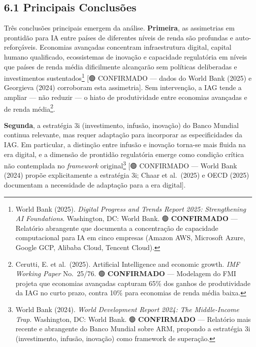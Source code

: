 \documentclass[
  brazilian,
  12pt,
]{article}
\begin{document}
\subsection{6.1 Principais Conclusões}\label{principais-conclusuxf5es}

Três conclusões principais emergem da análise. \textbf{Primeira}, as assimetrias em prontidão para IA entre países de diferentes níveis de renda são profundas e auto-reforçáveis. Economias avançadas concentram infraestrutura digital, capital humano qualificado, ecossistemas de inovação e capacidade regulatória em níveis que países de renda média dificilmente alcançarão sem políticas deliberadas e investimentos sustentados\footnote{World Bank (2025). \emph{Digital Progress and Trends Report 2025: Strengthening AI Foundations}. Washington, DC: World Bank. 🟢 \textbf{CONFIRMADO} --- Relatório abrangente que documenta a concentração de capacidade computacional para IA em cinco empresas (Amazon AWS, Microsoft Azure, Google GCP, Alibaba Cloud, Tencent Cloud).} {[}🟢 CONFIRMADO --- dados do World Bank (2025) e Georgieva (2024) corroboram esta assimetria{]}. Sem intervenção, a IAG tende a ampliar --- não reduzir --- o hiato de produtividade entre economias avançadas e de renda média\footnote{Cerutti, E. et al.~(2025). Artificial Intelligence and economic growth. \emph{IMF Working Paper} No.~25/76. 🟢 \textbf{CONFIRMADO} --- Modelagem do FMI projeta que economias avançadas capturam 65\% dos ganhos de produtividade da IAG no curto prazo, contra 10\% para economias de renda média baixa.}.

\textbf{Segunda}, a estratégia 3i (investimento, infusão, inovação) do Banco Mundial continua relevante, mas requer adaptação para incorporar as especificidades da IAG. Em particular, a distinção entre infusão e inovação torna-se mais fluida na era digital, e a dimensão de prontidão regulatória emerge como condição crítica não contemplada no \emph{framework} original\footnote{World Bank (2024). \emph{World Development Report 2024: The Middle-Income Trap}. Washington, DC: World Bank. 🟢 \textbf{CONFIRMADO} --- Relatório mais recente e abrangente do Banco Mundial sobre ARM, propondo a estratégia 3i (investimento, infusão, inovação) como framework de superação.} {[}🟢 CONFIRMADO --- World Bank (2024) propõe explicitamente a estratégia 3i; Chaar et al.~(2025) e OECD (2025) documentam a necessidade de adaptação para a era digital{]}.
\end{document}

